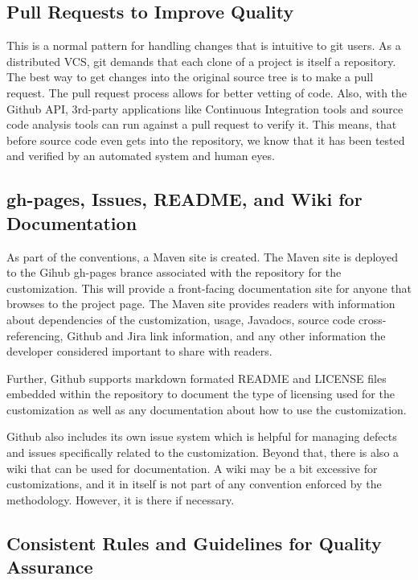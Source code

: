 \documentclass[12pt]{report}
\begin{document}
\subsection{Pull Requests to Improve Quality}
This is a normal pattern for handling changes that is intuitive to git users. As
a distributed VCS, git demands that each clone of a project is itself a repository. The best way to get changes into the original
source tree is to make a pull request. The pull request process allows for better vetting of code. Also, with the Github API, 3rd-party
applications like Continuous Integration tools and source code analysis tools can run against a pull request to verify it. This means,
that before source code even gets into the repository, we know that it has been tested and verified by an automated system and human
eyes.

\subsection{gh-pages, Issues, README, and Wiki for Documentation}

As part of the conventions, a Maven site is created. The Maven site is deployed to the Gihub gh-pages brance associated with the
repository for the customization. This will provide a front-facing documentation site for anyone that browses to the project page. 
The Maven site provides readers with information about dependencies of the customization, usage, Javadocs, source code cross-referencing,
 Github and Jira link information, and any other information the developer considered important to share with readers.

Further, Github supports markdown formated README and LICENSE files embedded within the repository to document the type of licensing
used for the customization as well as any documentation about how to use the customization.

Github also includes its own issue system which is helpful for managing defects and issues specifically related to the customization. 
Beyond that, there is also a wiki that can be used for documentation. A wiki may be a bit excessive for customizations, and it
in itself is not part of any convention enforced by the methodology. However, it is there if necessary.

\subsection{Consistent Rules and Guidelines for Quality Assurance}
\end{document}
